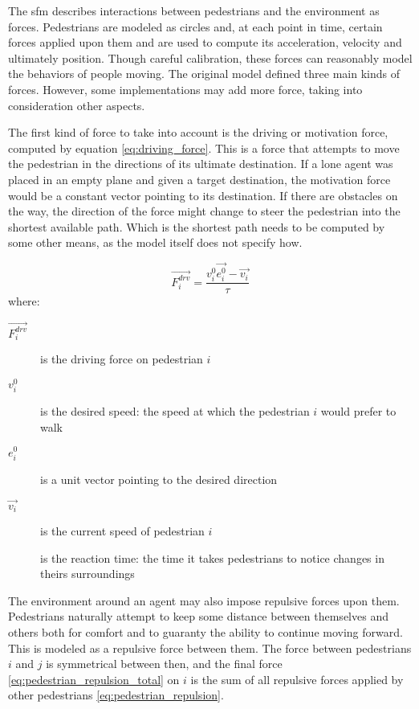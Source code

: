 \documentclass[twoside, 11pt]{article}
\begin{document}
The \gls{sfm} describes interactions between pedestrians and the environment as forces. Pedestrians are modeled as circles and, at each point in time, certain forces applied upon them and are used to compute its acceleration, velocity and ultimately position. Though careful calibration, these forces can reasonably model the behaviors of people moving. The original model defined three main kinds of forces. However, some implementations may add more force, taking into consideration other aspects.

The first kind of force to take into account is the driving or motivation force, computed by equation \eqref{eq:driving_force}. This is a force that attempts to move the pedestrian in the directions of its ultimate destination. If a lone agent was placed in an empty plane and given a target destination, the motivation force would be a constant vector pointing to its destination. If there are obstacles on the way, the direction of the force might change to steer the pedestrian into the shortest available path. Which is the shortest path needs to be computed by some other means, as the model itself does not specify how.

\begin{equation}
  \vec{F_i^{drv}} = \frac{v_i^0 \vec{e_i^0} - \vec{v_i}}{\tau}
  \label{eq:driving_force}
\end{equation}
where:
\begin{description}
  \item[$\vec{F_i^{drv}}$] is the driving force on pedestrian $i$
  \item[$v_i^0$] is the desired speed: the speed at which the pedestrian $i$ would prefer to walk
  \item[$e_i^0$] is a unit vector pointing to the desired direction
  \item[$\vec{v_i}$] is the current speed of pedestrian $i$
  \item[\tau] is the reaction time: the time it takes pedestrians to notice changes in theirs surroundings 
\end{description}

The environment around an agent may also impose repulsive forces upon them. Pedestrians naturally attempt to keep some distance between themselves and others both for comfort and to guaranty the ability to continue moving forward. This is modeled as a repulsive force between them. The force between pedestrians $i$ and $j$ is symmetrical between then, and the final force \eqref{eq:pedestrian_repulsion_total} on $i$ is the sum of all repulsive forces applied by other pedestrians \eqref{eq:pedestrian_repulsion}.
\end{document}
